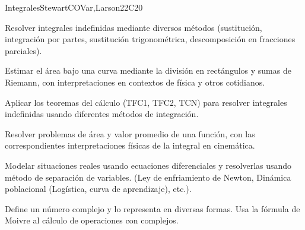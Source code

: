\begin{syllabus}
\begin{unit}{Integrales}{}{StewartCOVar,Larson}{22}{C20}
   \begin{learningoutcomes}
      \item Resolver integrales indefinidas mediante diversos métodos (sustitución, integración por partes, sustitución trigonométrica, descomposición en fracciones parciales).
      \item Estimar el área bajo una curva mediante la división en rectángulos y sumas de Riemann, con interpretaciones en contextos de física y otros cotidianos.  
      \item Aplicar los teoremas del cálculo (TFC1, TFC2, TCN) para resolver integrales indefinidas usando diferentes métodos de integración.
      \item Resolver problemas de área y valor promedio de una función, con las correspondientes interpretaciones físicas de la integral en cinemática. 
      \item Modelar situaciones reales usando ecuaciones diferenciales y resolverlas usando método de separación de variables. (Ley de enfriamiento de Newton, Dinámica poblacional (Logística, curva de aprendizaje), etc.).
      \item Define un número complejo y lo representa en diversas formas. Usa la fórmula de Moivre al cálculo de operaciones con complejos.
   \end{learningoutcomes}
\end{unit}

\begin{coursebibliography}
\end{coursebibliography}

\end{syllabus}
   
